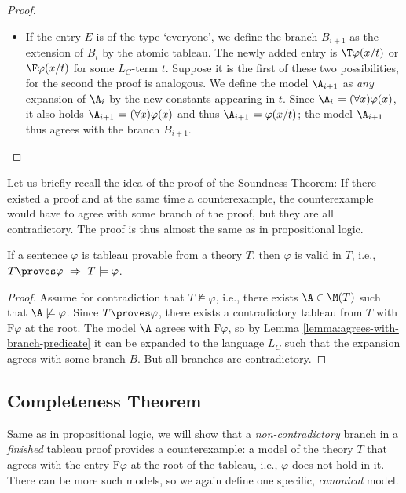 \begin{proof}
\begin{itemize}
\begin{itemize}
            \item If the entry $E$ is of the type `everyone', we define the branch $B_{i+1}$ as the extension of $B_i$ by the atomic tableau. The newly added entry is $\T\varphi(x/t)$ or $\F\varphi(x/t)$ for some $L_C$-term $t$. Suppose it is the first of these two possibilities, for the second the proof is analogous. 
            We define the model $\A_{i+1}$ as \emph{any} expansion of $\A_i$ by the new constants appearing in $t$.    
            Since $\A_i\models(\forall x)\varphi(x)$, it also holds $\A_{i+1}\models(\forall x)\varphi(x)$ and thus $\A_{i+1}\models\varphi(x/t)$; the model $\A_{i+1}$ thus agrees with the branch $B_{i+1}$.
        \end{itemize}       
    \end{itemize}
\end{proof}

Let us briefly recall the idea of the proof of the Soundness Theorem: If there existed a proof and at the same time a counterexample, the counterexample would have to agree with some branch of the proof, but they are all contradictory. The proof is thus almost the same as in propositional logic.

\begin{theorem}[On Soundness]
If a sentence $\varphi$ is tableau provable from a theory $T$, then $\varphi$ is valid in $T$, i.e., $T\proves\varphi\ \Rightarrow\ T\models\varphi$.    
\end{theorem}

\begin{proof}
Assume for contradiction that $T\not\models\varphi$, i.e., there exists $\A\in\M(T)$ such that $\A\not\models\varphi$. Since $T\proves\varphi$, there exists a contradictory tableau from $T$ with $\mathrm{F}\varphi$ at the root. The model $\A$ agrees with $\mathrm{F}\varphi$, so by Lemma \ref{lemma:agrees-with-branch-predicate} it can be expanded to the language $L_C$ such that the expansion agrees with some branch $B$. But all branches are contradictory.
\end{proof}


\subsection{Completeness Theorem}

Same as in propositional logic, we will show that a \emph{non-contradictory} branch in a \emph{finished} tableau proof provides a counterexample: a model of the theory $T$ that agrees with the entry $\mathrm{F}\varphi$ at the root of the tableau, i.e., $\varphi$ does not hold in it. There can be more such models, so we again define one specific, \emph{canonical} model.


